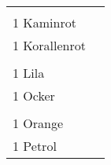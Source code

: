 \documentclass{article}\usepackage[ngerman]{babel}\usepackage{geometry}\usepackage{lmodern}
\begin{document}
\begin{table}[p]
  \begin{tabular}{ll}    \hspace{-2em}    \fbox{\begin{minipage}[t][6cm][t]{8cm}
        \fontsize{45}{54} \selectfont
        \phantom{ }\\
      \phantom{ }1 Kaminrot    \end{minipage}}
    &
\fbox{\begin{minipage}[t][6cm][t]{8cm}
        \fontsize{45}{54} \selectfont
        \phantom{ }\\
        \phantom{ } 1 Korallenrot      \end{minipage}}\\    \hspace{-2em}    \fbox{\begin{minipage}[t][6cm][t]{8cm}
        \fontsize{45}{54} \selectfont
        \phantom{ }\\
      \phantom{ }1 Lila    \end{minipage}}
    &
\fbox{\begin{minipage}[t][6cm][t]{8cm}
        \fontsize{45}{54} \selectfont
        \phantom{ }\\
        \phantom{ } 1 Ocker      \end{minipage}}\\    \hspace{-2em}    \fbox{\begin{minipage}[t][6cm][t]{8cm}
        \fontsize{45}{54} \selectfont
        \phantom{ }\\
      \phantom{ }1 Orange    \end{minipage}}
    &
\fbox{\begin{minipage}[t][6cm][t]{8cm}
        \fontsize{45}{54} \selectfont
        \phantom{ }\\
        \phantom{ } 1 Petrol      \end{minipage}}\\\end{tabular}
\end{table}
\end{document}

